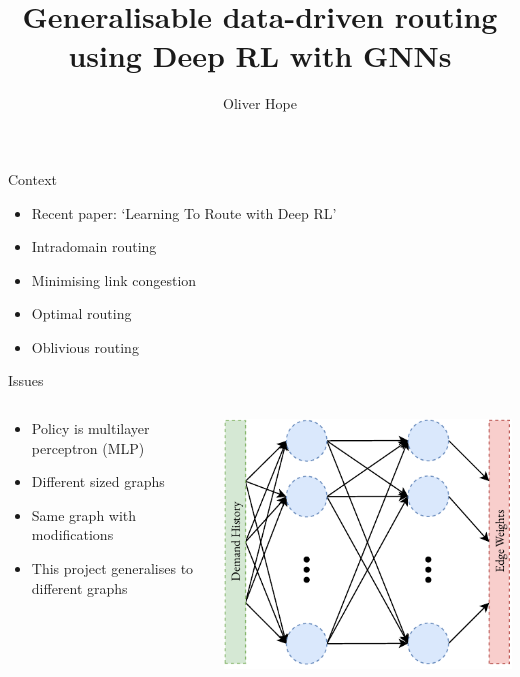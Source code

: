 \documentclass{beamer}
\title{Generalisable data-driven routing using Deep RL with GNNs}
\author{Oliver Hope}
\institute{Jesus College}\date{}
\begin{document}
\maketitle

\begin{frame}{Context}
  \begin{itemize}
    \item Recent paper: `Learning To Route with Deep RL'\cite{valadarsky2017learning}
    \item Intradomain routing
    \item Minimising link congestion
    \item Optimal routing
    \item Oblivious routing\cite{racke2002minimizing}
  \end{itemize}
\end{frame}

\begin{frame}{Issues}
\begin{columns}
  \begin{column}{0.5\textwidth}
  \begin{itemize}
    \item Policy is multilayer perceptron (MLP)
    \item Different sized graphs
    \item Same graph with modifications
    \item This project generalises to different graphs
  \end{itemize}
  \end{column}
  \begin{column}{0.5\textwidth}
    \includegraphics[width=\textwidth]{figures/mlp.pdf}
  \end{column}
\end{columns}
\end{frame}
\end{document}
